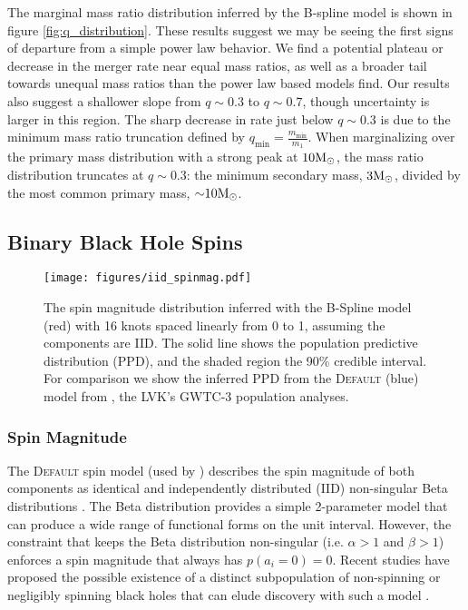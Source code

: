 The marginal mass ratio distribution inferred by the B-spline model is shown in figure \ref{fig:q_distribution}.  These results suggest we may be seeing the first signs of departure from a simple power law behavior.  We find a potential plateau or decrease in the merger rate near equal mass ratios, as well as a broader tail towards unequal mass ratios 
than the power law based models find. Our results also suggest a shallower slope from $q\sim0.3$ to $q\sim0.7$, though uncertainty is larger in this region. The sharp decrease in rate just below 
$q\sim0.3$ is due to the minimum mass ratio truncation defined by $q_\mathrm{min}=\frac{m_\mathrm{min}}{m_1}$. When marginalizing over the primary mass 
distribution with a strong peak at $10{\rm M}_\odot$, the mass ratio distribution truncates at $q\sim0.3$: the minimum secondary mass, $3{\rm M}_\odot$, 
divided by the most common primary mass, ${\sim}10{\rm M}_\odot$. 


\subsection{Binary Black Hole Spins} \label{sec:spin_dist}

\begin{figure}
    \begin{centering}    
        \texttt{[image: figures/iid\_spinmag.pdf]}
        \caption{The spin magnitude distribution inferred with the B-Spline model (red) with 16 knots spaced linearly from 0 to 1, assuming the components are IID. The solid line shows the population predictive distribution (PPD), and the shaded region the 90\% credible interval. 
        For comparison we show the inferred PPD from the \textsc{Default} (blue) model from \citet{o3b_astro_dist}, the LVK's GWTC-3 population analyses.}
        \label{fig:iid_spinmag_dist}
    \end{centering}
\end{figure}

\subsubsection{Spin Magnitude}

The \textsc{Default} spin model (used by \citet{o3b_astro_dist}) describes the spin magnitude of both components as identical and independently distributed (IID) non-singular Beta distributions \citep{Talbot_2017,Wysocki_2019}.
The Beta distribution provides a simple 2-parameter model that can produce a wide range of functional forms on the unit interval. However, the constraint that keeps 
the Beta distribution non-singular (i.e. $\alpha>1$ and $\beta>1$) enforces a spin magnitude that always has $p(a_i=0) = 0$. Recent studies have proposed the possible existence of a 
distinct subpopulation of non-spinning or negligibly spinning black holes that can elude discovery with such a model \citep{FullerMa2019,RouletGWTC2Pop,BuildBetterSpinModels,Callister_NoEvidence,GWTC3MonashSpin}. 

